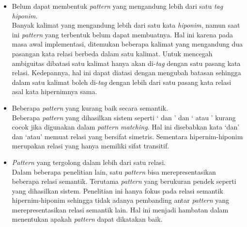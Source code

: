 \begin{itemize}
  \item Belum dapat membentuk \textit{pattern} yang mengandung lebih dari satu \textit{tag hiponim}. \\
  Banyak kalimat yang mengandung lebih dari satu kata \textit{hiponim}, namun saat ini \textit{pattern} yang terbentuk belum dapat membuatnya. Hal ini karena pada masa awal implementasi, ditemukan beberapa kalimat yang mengandung dua pasangan kata relasi berbeda dalam satu kalimat. Untuk mencegah ambiguitas dibatasi satu kalimat hanya akan di-\textit{tag} dengan satu pasang kata relasi. Kedepannya, hal ini dapat diatasi dengan mengubah batasan sehingga dalam satu kalimat boleh di-\textit{tag} dengan lebih dari satu pasang kata relasi asal kata hipernimnya sama. 
  \item Beberapa \textit{pattern} yang kurang baik secara semantik. \\
  Beberapa \textit{pattern} yang dihasilkan sistem seperti `{\tagHypernym} dan {\tagHyponym}' dan  `{\tagHypernym} atau {\tagHyponym}' kurang cocok jika digunakan dalam \textit{pattern matching}. Hal ini disebabkan kata `dan' dan `atau' memuat relasi yang bersifat simetris. Sementara hipernim-hiponim merupakan relasi yang hanya memiliki sifat transitif.
  \item \textit{Pattern} yang tergolong dalam lebih dari satu relasi. \\
  Dalam beberapa penelitian lain, satu \textit{pattern} bisa merepresentasikan beberapa relasi semantik. Terutama \textit{pattern} yang berukuran pendek seperti yang dihasilkan sistem. Penelitian ini hanya fokus pada relasi semantik hipernim-hiponim sehingga tidak adanya pembanding antar \textit{pattern} yang merepresentasikan relasi semantik lain. Hal ini menjadi hambatan dalam menentukan apakah \textit{pattern} dapat dikatakan baik.
\end{itemize}

